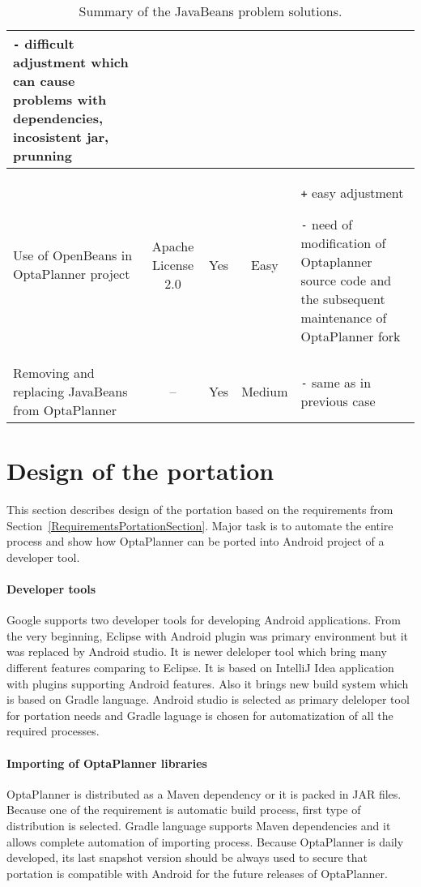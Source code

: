\begin {table}[h!]
{\begin{tabular}{|l|c|c|c|p{5cm}|}
            \texttt{-} difficult adjustment which can cause problems with dependencies, incosistent jar, prunning
            \\ \hline

            \multicolumn{1}{|p{2.5cm}|}{Use of OpenBeans in OptaPlanner project} &
            \multicolumn{1}{p{2cm}|}{\centering Apache License 2.0} &
            Yes &
            Easy &
            \texttt{+} easy adjustment

            \texttt{-} need of modification of Optaplanner source code and the subsequent maintenance of
            OptaPlanner fork \\ \hline

            \multicolumn{1}{|p{2.5cm}|}{Removing and replacing JavaBeans from OptaPlanner} &
            -- &
            Yes &
            Medium &
            \texttt{-} same as in previous case\\ \hline
        \end{tabular}
    }
    \centering
    \caption{Summary of the JavaBeans problem solutions.}
    \label{SummaryJavaBeansTable}
\end{table}

\section{Design of the portation}
This section describes design of the portation based on the requirements from
Section~\ref{RequirementsPortationSection}. Major task is to automate the entire process and show how OptaPlanner can be
ported into Android project of a developer tool.

\paragraph{Developer tools}
Google supports two developer tools for developing Android applications. From the very beginning, Eclipse with Android
plugin was primary environment but it was replaced by Android studio. It is newer deleloper tool which bring many
different features comparing to Eclipse. It is based on IntelliJ Idea application with plugins supporting Android
features. Also it brings new build system which is based on Gradle language. Android studio is selected as primary
deleloper tool for portation needs and Gradle laguage is chosen for automatization of all the required processes.

\paragraph{Importing of OptaPlanner libraries}
OptaPlanner is distributed as a Maven dependency or it is packed in JAR files. Because one of the requirement is
automatic build process, first type of distribution is selected. Gradle language supports Maven dependencies and it
allows complete automation of importing process. Because OptaPlanner is daily developed, its last snapshot version
should be always used to secure that portation is compatible with Android for the future releases of OptaPlanner.

